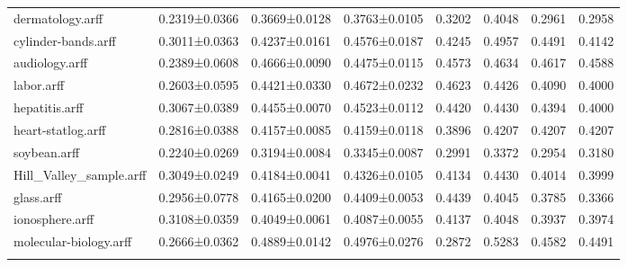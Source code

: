 \begin{table*}[h]
\begin{tabular}{llllllll}
dermatology.arff&0.2319±0.0366&0.3669±0.0128&0.3763±0.0105&0.3202&0.4048&0.2961&0.2958\\
cylinder-bands.arff&0.3011±0.0363&0.4237±0.0161&0.4576±0.0187&0.4245&0.4957&0.4491&0.4142\\
audiology.arff&0.2389±0.0608&0.4666±0.0090&0.4475±0.0115&0.4573&0.4634&0.4617&0.4588\\
labor.arff&0.2603±0.0595&0.4421±0.0330&0.4672±0.0232&0.4623&0.4426&0.4090&0.4000\\
hepatitis.arff&0.3067±0.0389&0.4455±0.0070&0.4523±0.0112&0.4420&0.4430&0.4394&0.4000\\
heart-statlog.arff&0.2816±0.0388&0.4157±0.0085&0.4159±0.0118&0.3896&0.4207&0.4207&0.4207\\
soybean.arff&0.2240±0.0269&0.3194±0.0084&0.3345±0.0087&0.2991&0.3372&0.2954&0.3180\\
Hill_Valley_sample.arff&0.3049±0.0249&0.4184±0.0041&0.4326±0.0105&0.4134&0.4430&0.4014&0.3999\\
glass.arff&0.2956±0.0778&0.4165±0.0200&0.4409±0.0053&0.4439&0.4045&0.3785&0.3366\\
ionosphere.arff&0.3108±0.0359&0.4049±0.0061&0.4087±0.0055&0.4137&0.4048&0.3937&0.3974\\
molecular-biology.arff&0.2666±0.0362&0.4889±0.0142&0.4976±0.0276&0.2872&0.5283&0.4582&0.4491\\
\noalign{\smallskip}\hline
\end{tabular}
\end{table*}